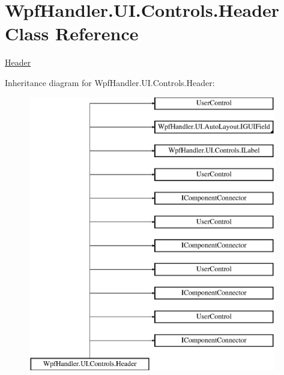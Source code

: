 \hypertarget{class_wpf_handler_1_1_u_i_1_1_controls_1_1_header}{}\section{Wpf\+Handler.\+U\+I.\+Controls.\+Header Class Reference}
\label{class_wpf_handler_1_1_u_i_1_1_controls_1_1_header}


\mbox{\hyperlink{class_wpf_handler_1_1_u_i_1_1_controls_1_1_header}{Header}}  


Inheritance diagram for Wpf\+Handler.\+U\+I.\+Controls.\+Header\+:\begin{figure}[H]
\begin{center}
\leavevmode
\includegraphics[height=12.000000cm]{d2/dc0/class_wpf_handler_1_1_u_i_1_1_controls_1_1_header}
\end{center}
\end{figure}
